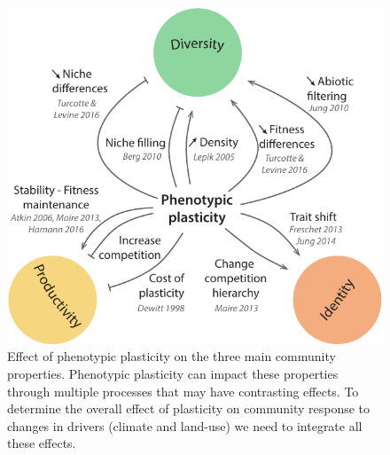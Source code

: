 \begin{figure}
    \includegraphics{./1_Introduction/graphics/effect_plasticity.pdf}
  \caption[Phenotypic plasticity effect on community properties]{Effect of phenotypic plasticity on the three main community properties. Phenotypic plasticity can impact these properties through multiple processes that may have contrasting effects. To determine the overall effect of plasticity on community response to changes in drivers (climate and land-use) we need to integrate all these effects.}
  \label{fig:plasticity-effect}
\end{figure}


%



